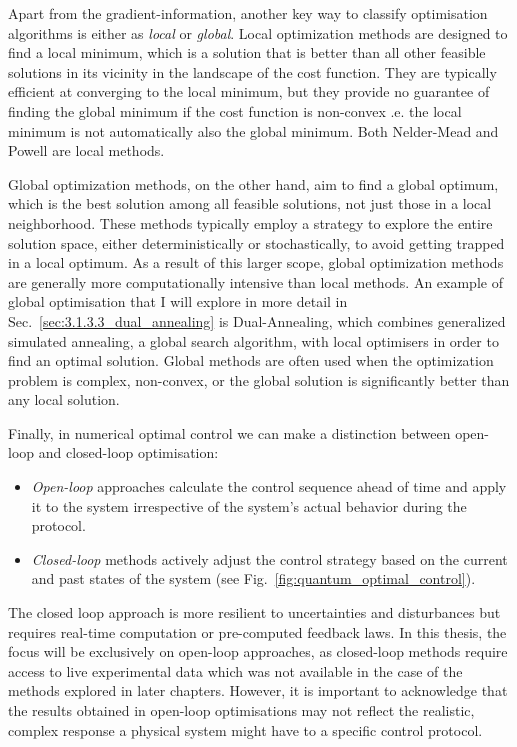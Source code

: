 Apart from the gradient-information, another key way to classify optimisation algorithms is either as \emph{local} or \emph{global}. Local optimization methods are designed to find a local minimum, which is a solution that is better than all other feasible solutions in its vicinity in the landscape of the cost function. They are typically efficient at converging to the local minimum, but they provide no guarantee of finding the global minimum if the cost function is non-convex \@i.e. the local minimum is not automatically also the global minimum. Both Nelder-Mead and Powell are local methods.

Global optimization methods, on the other hand, aim to find a global optimum, which is the best solution among all feasible solutions, not just those in a local neighborhood. These methods typically employ a strategy to explore the entire solution space, either deterministically or stochastically, to avoid getting trapped in a local optimum. As a result of this larger scope, global optimization methods are generally more computationally intensive than local methods. An example of global optimisation that I will explore in more detail in Sec.~\ref{sec:3.1.3.3_dual_annealing} is Dual-Annealing, which combines generalized simulated annealing\cite{tsallis_generalized_1996}, a global search algorithm, with local optimisers in order to find an optimal solution. Global methods are often used when the optimization problem is complex, non-convex, or the global solution is significantly better than any local solution.

Finally, in numerical optimal control we can make a distinction between open-loop and closed-loop optimisation:
\begin{itemize}
    \item \emph{Open-loop} approaches calculate the control sequence ahead of time and apply it to the system irrespective of the system's actual behavior during the protocol. 
    \item \emph{Closed-loop} methods actively adjust the control strategy based on the current and past states of the system (see Fig.~\ref{fig:quantum_optimal_control}).
\end{itemize}
The closed loop approach is more resilient to uncertainties and disturbances but requires real-time computation or pre-computed feedback laws. In this thesis, the focus will be exclusively on open-loop approaches, as closed-loop methods require access to live experimental data which was not available in the case of the methods explored in later chapters. However, it is important to acknowledge that the results obtained in open-loop optimisations may not reflect the realistic, complex response a physical system might have to a specific control protocol. 

